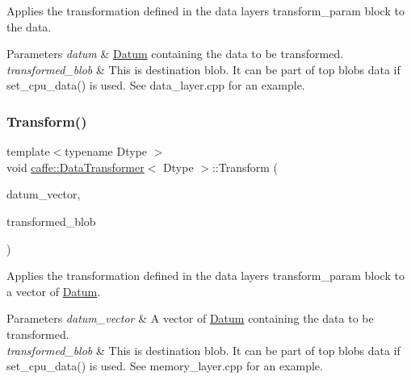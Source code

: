 Applies the transformation defined in the data layer\textquotesingle{}s transform\+\_\+param block to the data. 


\begin{DoxyParams}{Parameters}
{\em datum} & \mbox{\hyperlink{classcaffe_1_1_datum}{Datum}} containing the data to be transformed. \\
\hline
{\em transformed\+\_\+blob} & This is destination blob. It can be part of top blob\textquotesingle{}s data if set\+\_\+cpu\+\_\+data() is used. See data\+\_\+layer.\+cpp for an example. \\
\hline
\end{DoxyParams}
\mbox{\label{classcaffe_1_1_data_transformer_a082cad626c5f51c9f8d93bb88cca1bd0}} 
\subsubsection{\texorpdfstring{Transform()}{Transform()}\hspace{0.1cm}{\footnotesize\ttfamily [3/6]}}
{\footnotesize\ttfamily template$<$typename Dtype $>$ \\
void \mbox{\hyperlink{classcaffe_1_1_data_transformer}{caffe\+::\+Data\+Transformer}}$<$ Dtype $>$\+::Transform (\begin{DoxyParamCaption}\item[{const vector$<$ \mbox{\hyperlink{classcaffe_1_1_datum}{Datum}} $>$ \&}]{datum\+\_\+vector,  }\item[{\mbox{\hyperlink{classcaffe_1_1_blob}{Blob}}$<$ Dtype $>$ $\ast$}]{transformed\+\_\+blob }\end{DoxyParamCaption})}



Applies the transformation defined in the data layer\textquotesingle{}s transform\+\_\+param block to a vector of \mbox{\hyperlink{classcaffe_1_1_datum}{Datum}}. 


\begin{DoxyParams}{Parameters}
{\em datum\+\_\+vector} & A vector of \mbox{\hyperlink{classcaffe_1_1_datum}{Datum}} containing the data to be transformed. \\
\hline
{\em transformed\+\_\+blob} & This is destination blob. It can be part of top blob\textquotesingle{}s data if set\+\_\+cpu\+\_\+data() is used. See memory\+\_\+layer.\+cpp for an example. \\
\hline
\end{DoxyParams}
\mbox{\label{classcaffe_1_1_data_transformer_a082cad626c5f51c9f8d93bb88cca1bd0}} 
